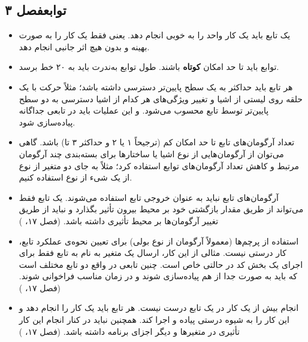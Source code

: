 \documentclass{utap}
\newcommand{\chap}[1]{\hfill\normalfont\normalsize فصل #1}
\begin{document}
\subsection[توابع]{توابع\chap{۳}}
  \begin{itemize}
	\item
یک تابع باید یک کار واحد را به خوبی انجام دهد. یعنی فقط یک کار را به صورت بهینه و بدون هیچ اثر جانبی انجام دهد.
    \item
توابع باید تا حد امکان \textbf{کوتاه} باشند.
طول توابع به‌ندرت باید به ۲۰ خط برسد.
	\item
هر تابع باید حداکثر به یک سطح پایین‌تر دسترسی داشته باشد؛ مثلاً حرکت با یک حلقه روی لیستی از اشیا و تغییر ویژگی‌های هر کدام از اشیا دسترسی به دو سطح پایین‌تر توسط تابع محسوب می‌شود. و این عملیات باید در تابعی جداگانه پیاده‌سازی شود.
	\item
تعداد آرگومان‌های تابع تا حد امکان کم (ترجیحاً ۱ یا ۲ و حداکثر ۳ تا) باشد.
گاهی می‌توان از آرگومان‌هایی از نوع اشیا یا ساختارها برای بسته‌بندی چند آرگومان مرتبط و کاهش تعداد آرگومان‌های توابع استفاده کرد؛ مثلاً به جای دو متغیر از نوع  از یک شیء از نوع  استفاده کنیم.
    \item
آرگومان‌های تابع نباید به عنوان خروجی تابع استفاده می‌شوند.
یک تابع فقط می‌تواند از طریق مقدار بازگشتی خود بر محیط بیرون تأثیر بگذارد و نباید از طریق تغییر آرگومان‌ها بر محیط تأثیری داشته باشد. (فصل ۱۷، )
    \item
استفاده از پرچم‌ها (معمولاً آرگومان از نوع بولی) برای تعیین نحوه‌ی عملکرد تابع، کار درستی نیست.
مثالی از این کار، ارسال یک متغیر به نام  به تابع فقط برای اجرای یک بخش کد در حالتی خاص است. چنین تابعی در واقع دو تابع مختلف است که باید به صورت جدا از هم پیاده‌سازی شوند و در زمان مناسب فراخوانی شوند. (فصل ۱۷، )
    \item
انجام بیش از یک کار در یک تابع درست نیست. هر تابع باید یک کار را انجام دهد و این کار را به شیوه درستی پیاده و اجرا کند. همچنین نباید در کنار انجام این کار تأثیری در متغیرها و دیگر اجزای برنامه داشته باشد. (فصل ۱۷، )
    \end{itemize}
\end{document}
